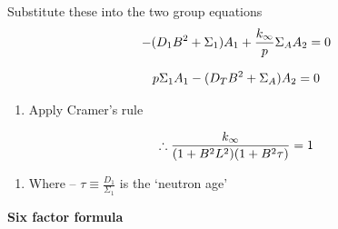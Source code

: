 \documentclass[aspectratio=1610,pdftex,dvipsnames,compress,xcolor={dvipsnames}]{beamer}
\begin{document}
\begin{frame}{Substitute these into the two group equations}
    \begin{equation}
        \LARGE
        -(D_1 B^2 + \Sigma_1) A_1 + \frac{k_\infty}{p} \Sigma_A A_2=0
    \end{equation}

    \begin{equation}
        \LARGE
        p \Sigma_1 A_1 - (D_TB^2 + \Sigma_A) A_2 = 0
    \end{equation}

    \vspace*{\fill}

    \begin{enumerate}[series=outerlist,topsep=0pt,itemsep=11pt,leftmargin=*,label=(\arabic*)]
        \item[]Apply Cramer's rule
    \end{enumerate}

    \vspace*{\fill}

    \begin{equation}
        \LARGE
        \therefore \frac{k_\infty}{(1 + B^2 L^2)(1 + B^2 \tau)} = 1
    \end{equation}

    \vspace*{\fill}

    \begin{enumerate}[series=outerlist,topsep=0pt,itemsep=11pt,leftmargin=*,label=(\arabic*)]
        \item[]Where -- $\tau \equiv \frac{D_1}{\Sigma_1}$ is the `neutron age'
    \end{enumerate}
\end{frame}


\begin{frame}[plain]{}
    \centering\LARGE\textbf{Six factor formula}
\end{frame}
\end{document}
